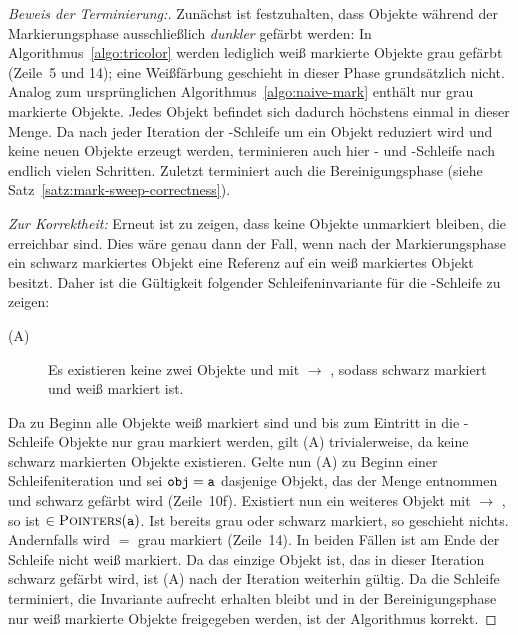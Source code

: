 \begin{proof}[Beweis der Terminierung:]
	Zunächst ist festzuhalten, dass Objekte während der Markierungsphase ausschließlich \textit{dunkler} gefärbt werden:
	In Algorithmus~\ref{algo:tricolor} werden lediglich weiß markierte Objekte grau gefärbt (Zeile~5 und 14); eine Weißfärbung geschieht in dieser Phase grundsätzlich nicht.
	Analog zum ursprünglichen Algorithmus~\ref{algo:naive-mark} enthält  nur grau markierte Objekte.
	Jedes Objekt befindet sich dadurch höchstens einmal in dieser Menge.
	Da  nach jeder Iteration der \WHILE-Schleife um ein Objekt reduziert wird und keine neuen Objekte erzeugt werden, terminieren auch hier \WHILE- und \FOREACH-Schleife nach endlich vielen Schritten.
	Zuletzt terminiert auch die Bereinigungsphase (siehe Satz~\ref{satz:mark-sweep-correctness}).
	
	\textit{Zur Korrektheit:} Erneut ist zu zeigen, dass keine Objekte unmarkiert bleiben, die erreichbar sind.
	Dies wäre genau dann der Fall, wenn nach der Markierungsphase ein schwarz markiertes Objekt eine Referenz auf ein weiß markiertes Objekt besitzt.
	Daher ist die Gültigkeit folgender Schleifeninvariante für die \WHILE-Schleife zu zeigen:
	\begin{description}
		\item[(A)] Es existieren keine zwei Objekte  und  mit  $\rightarrow$ , sodass  schwarz markiert und  weiß markiert ist.
	\end{description}
	Da zu Beginn alle Objekte weiß markiert sind und bis zum Eintritt in die \WHILE-Schleife Objekte nur grau markiert werden, gilt (A) trivialerweise, da keine schwarz markierten Objekte existieren.
	Gelte nun (A) zu Beginn einer Schleifeniteration und sei $\texttt{obj} = \texttt{a}$ dasjenige Objekt, das der Menge  entnommen und schwarz gefärbt wird (Zeile~10f).
	Existiert nun ein weiteres Objekt  mit  $\rightarrow$ , so ist  $\in \textsc{Pointers}(\texttt{a})$.
	Ist  bereits grau oder schwarz markiert, so geschieht nichts.
	Andernfalls wird  $=$  grau markiert (Zeile~14).
	In beiden Fällen ist  am Ende der Schleife nicht weiß markiert.
	Da  das einzige Objekt ist, das in dieser Iteration schwarz gefärbt wird, ist (A) nach der Iteration weiterhin gültig.
	Da die Schleife terminiert, die Invariante aufrecht erhalten bleibt und in der Bereinigungsphase nur weiß markierte Objekte freigegeben werden, ist der Algorithmus korrekt.
\end{proof}

